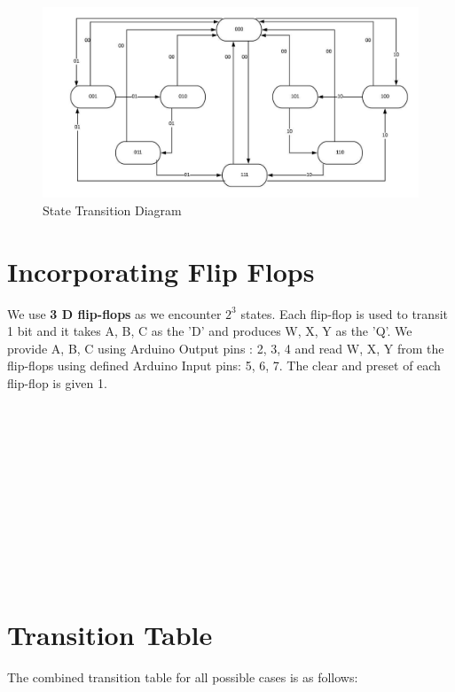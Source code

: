 \documentclass[12pt, letterpaper]{report}
\begin{document}
  

\begin{figure}
    \centering
    \includegraphics[scale=0.7]{States}
    \caption{State Transition Diagram}
    \label{fig:my_label}
\end{figure}




\section{Incorporating Flip Flops}

We use \textbf{3 D flip-flops} as we encounter $2^3$ states. Each flip-flop is used to transit 1 bit and it takes A, B, C as the 'D' and produces W, X, Y as the 'Q'. We provide A, B, C using Arduino Output pins : 2, 3, 4 and read W, X, Y from the flip-flops using defined Arduino Input pins: 5, 6, 7. The clear and preset of each flip-flop is given 1. \\ \\ \\ \\ \\ \\ \\ \\ \\ \\ \\ \\

\section{Transition Table}

The combined transition table for all possible cases is as follows:
\end{document}
